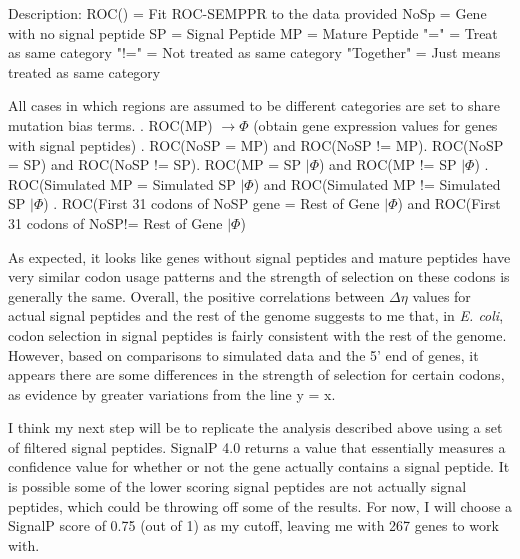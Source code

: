 \documentclass[11pt]{labbook}
\begin{document}
Description:\newline
ROC() = Fit ROC-SEMPPR to the data provided \newline 
NoSp = Gene with no signal peptide\newline
SP = Signal Peptide \newline
MP = Mature Peptide\newline
"=" = Treat as same category \newline
"!=" = Not treated as same category \newline
"Together" = Just means treated as same category

All cases in which regions are assumed to be different categories are set to share mutation bias terms.
. ROC(MP) $\rightarrow \Phi$ (obtain gene expression values for genes with signal peptides) . ROC(NoSP = MP) and ROC(NoSP != MP). ROC(NoSP = SP) and ROC(NoSP != SP). ROC(MP = SP $|\Phi$) and ROC(MP != SP $|\Phi$) . ROC(Simulated MP = Simulated SP $|\Phi$) and ROC(Simulated MP != Simulated SP $|\Phi$) . ROC(First 31 codons of NoSP gene = Rest of Gene $|\Phi$) and ROC(First 31 codons of NoSP!= Rest of Gene $|\Phi$)



As expected, it looks like genes without signal peptides and mature peptides have very similar codon usage patterns and the strength of selection on these codons is generally the same. Overall, the positive correlations between $\Delta\eta$ values for actual signal peptides and the rest of the genome suggests to me that, in \textit{E. coli}, codon selection in signal peptides is fairly consistent with the rest of the genome. However, based on comparisons to simulated data and the 5' end of genes, it appears there are some differences in the strength of selection for certain codons, as evidence by greater variations from the line y = x.

I think my next step will be to replicate the analysis described above using a set of filtered signal peptides. SignalP 4.0 returns a value that essentially measures a confidence value for whether or not the gene actually contains a signal peptide. It is possible some of the lower scoring signal peptides are not actually signal peptides, which could be throwing off some of the results. For now, I will choose a SignalP score of 0.75 (out of 1) as my cutoff, leaving me with 267 genes to work with. 
\end{document}

